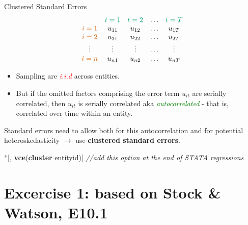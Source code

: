 \documentclass[
  10pt,
  ignorenonframetext,
]{beamer}
\newenvironment{Shaded}{\begin{snugshade}}{\end{snugshade}}
\newcommand{\CommentTok}[1]{\textcolor[rgb]{0.56,0.35,0.01}{\textit{#1}}}
\newcommand{\KeywordTok}[1]{\textcolor[rgb]{0.13,0.29,0.53}{\textbf{#1}}}
\newcommand{\NormalTok}[1]{#1}
\begin{document}
\begin{frame}[fragile]{Clustered Standard Errors}
\protect\hypertarget{clustered-standard-errors}{}
\[
\begin{matrix}
    & {\color{green}{t=1}}     & {\color{green}{t=2}}    & \ldots & {\color{green}{t=T}}
\\
{\color{red}{i=1}} & u_{11}  & u_{12} & \ldots & u_{1T}
\\
{\color{red}{i=2}} & u_{21}  & u_{22} & \ldots & u_{2T}
\\
\vdots & \vdots & \vdots & \ldots & \vdots
\\
{\color{red}{i=n}} & u_{n1}  & u_{n2} & \ldots & u_{nT}
\\
\end{matrix}
\]

\begin{itemize}
\item
  Sampling are \textcolor{red}{\textit{i.i.d}} across entities.
\item
  But if the omitted factors comprising the error term \(u_{it}\) are
  serially correlated, then \(u_{it}\) is serially correlated aka
  \textcolor{green}{\textit{autocorrelated}} - that is, correlated over
  time within an entity.
\end{itemize}

Standard errors need to allow both for this autocorrelation and for
potential heteroskedasticity \(\rightarrow\) use \textbf{clustered
standard errors}.

\small

\begin{Shaded}
\begin{Highlighting}[]
\NormalTok{*[, }\KeywordTok{vce}\NormalTok{(}\KeywordTok{cluster}\NormalTok{ entityid)]}
\CommentTok{//add this option at the end of STATA regressions }
\end{Highlighting}
\end{Shaded}
\end{frame}

\hypertarget{excercise-1-based-on-stock-watson-e10.1}{%
\section{Excercise 1: based on Stock \& Watson,
E10.1}\label{excercise-1-based-on-stock-watson-e10.1}}
\end{document}
